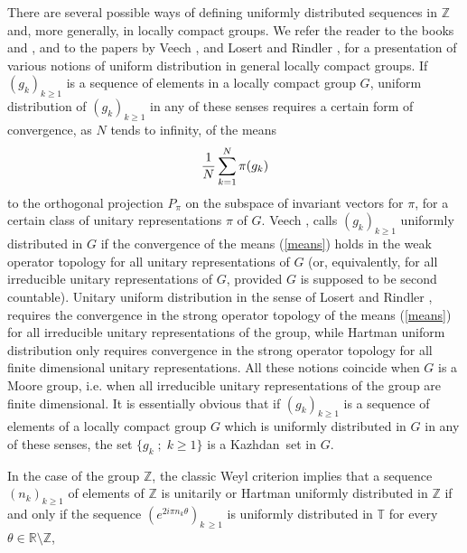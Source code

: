 \documentclass[11pt,english,a4paper]{smfart}
\numberwithin{equation}{section}
\theoremstyle{definition}
\begin{document}
There are several possible ways of defining uniformly distributed sequences in ${\ensuremath{\mathbb Z}}$ and, more generally, in locally compact groups.
We refer the reader to the books \cite{KuiNied} and \cite{DT}, and to the papers by Veech \cite{V1}, \cite{V2} and Losert and Rindler \cite{LR}, \cite{GLR} for a presentation of various notions of uniform distribution in general locally compact groups. If $(g_k)_{k\ge 1}$ is a sequence of elements in a locally compact group $G$, uniform distribution of $(g_k)_{k\ge 1}$ in any of these senses requires a certain form of convergence, as $N$ tends to infinity, of the means 
\begin{equation}\label{means}
 \dfrac{1}{N}{\displaystyle}\sum_{k=1}^{N}\pi(g_{k})
\end{equation}
to the orthogonal projection $P_{\pi}$ on the subspace of invariant vectors for $\pi$, for a certain class of unitary representations $\pi$ of $G$.
Veech \cite{V1}, \cite{V2} calls $(g_k)_{k\ge 1}$ uniformly distributed in $G$ if the convergence of the means (\ref{means}) holds in the weak operator topology for all unitary representations of $G$ (or, equivalently, for all irreducible unitary representations of $G$, provided $G$ is supposed to be second countable). Unitary uniform distribution in the sense of Losert and Rindler \cite{LR}, \cite{GLR} requires the convergence in the strong operator topology of the means (\ref{means}) for all irreducible unitary representations of the group, while Hartman uniform distribution only requires convergence in the strong operator topology for all finite dimensional unitary representations. All these notions coincide when $G$ is a Moore group, i.e. when all irreducible unitary representations of the group are finite dimensional. It is essentially obvious that 
if $(g_{k})_{k\ge 1}$ is a sequence of elements of a locally compact group $G$ which is uniformly distributed in $G$ in any of these senses, the set $\{g_k\;;\; k\ge 1\}$ is a {Kazhdan}\ set in $G$. 
\par\smallskip
In the case of the group ${\ensuremath{\mathbb Z}}$, the classic Weyl criterion \cite{KuiNied} implies that a sequence $(n_{k})_{k\ge 1}$ of 
elements of ${\ensuremath{\mathbb Z}}$ is unitarily or Hartman uniformly distributed in ${\ensuremath{\mathbb Z}}$ if and only if the sequence
 $(e^{2i\pi n_{k}\theta })_{k\,\ge 1}$ is uniformly distributed in 
${\ensuremath{\mathbb T}}$ for every  $\theta \in{\ensuremath{\mathbb R}}\setminus{\ensuremath{\mathbb Z}}$,
  \newsavebox{\abbaa}
\end{document}
